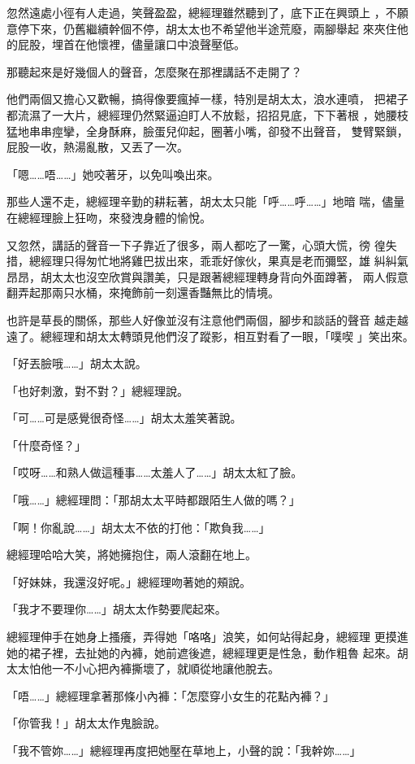 忽然遠處小徑有人走過，笑聲盈盈，總經理雖然聽到了，底下正在興頭上
，不願意停下來，仍舊繼續幹個不停，胡太太也不希望他半途荒廢，兩腳舉起
來夾住他的屁股，埋首在他懷裡，儘量讓口中浪聲壓低。

那聽起來是好幾個人的聲音，怎麼聚在那裡講話不走開了？

他們兩個又擔心又歡暢，搞得像要瘋掉一樣，特別是胡太太，浪水連噴，
把裙子都流濕了一大片，總經理仍然緊逼迫盯人不放鬆，招招見底，下下著根
，她腰枝猛地串串痙攣，全身酥麻，臉蛋兒仰起，圈著小嘴，卻發不出聲音，
雙臂緊鎖，屁股一收，熱湯亂散，又丟了一次。

「嗯……唔……」她咬著牙，以免叫喚出來。

那些人還不走，總經理辛勤的耕耘著，胡太太只能「呼……呼……」地暗
喘，儘量在總經理臉上狂吻，來發洩身體的愉悅。

又忽然，講話的聲音一下子靠近了很多，兩人都吃了一驚，心頭大慌，徬
徨失措，總經理只得匆忙地將雞巴拔出來，乖乖好傢伙，果真是老而彌堅，雄
糾糾氣昂昂，胡太太也沒空欣賞與讚美，只是跟著總經理轉身背向外面蹲著，
兩人假意翻弄起那兩只水桶，來掩飾前一刻還香豔無比的情境。

也許是草長的關係，那些人好像並沒有注意他們兩個，腳步和談話的聲音
越走越遠了。總經理和胡太太轉頭見他們沒了蹤影，相互對看了一眼，「噗喫
」笑出來。

「好丟臉哦……」胡太太說。

「也好刺激，對不對？」總經理說。

「可……可是感覺很奇怪……」胡太太羞笑著說。

「什麼奇怪？」

「哎呀……和熟人做這種事……太羞人了……」胡太太紅了臉。

「哦……」總經理問：「那胡太太平時都跟陌生人做的嗎？」

「啊！你亂說……」胡太太不依的打他：「欺負我……」

總經理哈哈大笑，將她擁抱住，兩人滾翻在地上。

「好妹妹，我還沒好呢。」總經理吻著她的頰說。

「我才不要理你……」胡太太作勢要爬起來。

總經理伸手在她身上搔癢，弄得她「咯咯」浪笑，如何站得起身，總經理
更摸進她的裙子裡，去扯她的內褲，她前遮後遮，總經理更是性急，動作粗魯
起來。胡太太怕他一不小心把內褲撕壞了，就順從地讓他脫去。

「唔……」總經理拿著那條小內褲：「怎麼穿小女生的花點內褲？」

「你管我！」胡太太作鬼臉說。

「我不管妳……」總經理再度把她壓在草地上，小聲的說：「我幹妳……」

